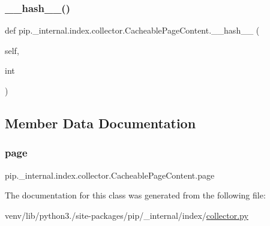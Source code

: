 \subsubsection{\texorpdfstring{\+\_\+\+\_\+hash\+\_\+\+\_\+()}{\_\_hash\_\_()}}
{\footnotesize\ttfamily def pip.\+\_\+internal.\+index.\+collector.\+Cacheable\+Page\+Content.\+\_\+\+\_\+hash\+\_\+\+\_\+ (\begin{DoxyParamCaption}\item[{}]{self,  }\item[{}]{int }\end{DoxyParamCaption})}



\subsection{Member Data Documentation}
\mbox{\label{classpip_1_1__internal_1_1index_1_1collector_1_1CacheablePageContent_aef8a7d606e4a405afbd2b8cfcac6e702}} 
\subsubsection{\texorpdfstring{page}{page}}
{\footnotesize\ttfamily pip.\+\_\+internal.\+index.\+collector.\+Cacheable\+Page\+Content.\+page}



The documentation for this class was generated from the following file\+:\begin{DoxyCompactItemize}
\item 
venv/lib/python3./site-\/packages/pip/\+\_\+internal/index/\hyperlink{collector_8py}{collector.\+py}\end{DoxyCompactItemize}
